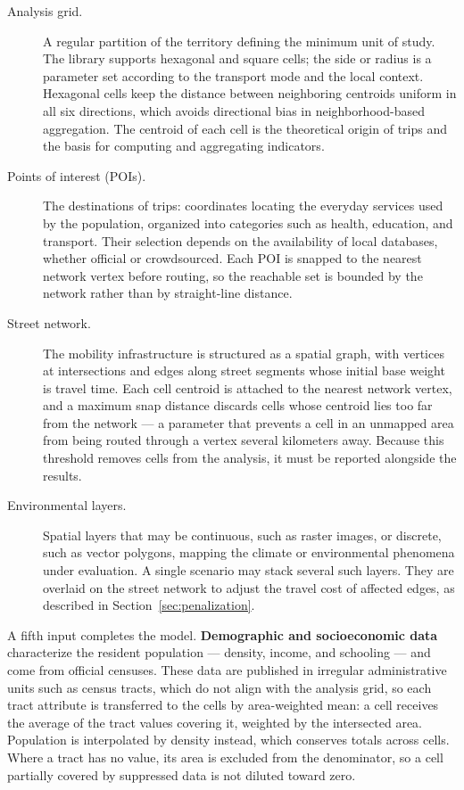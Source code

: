 \begin{description}
  \item[Analysis grid.] A regular partition of the territory defining the minimum unit of study. The library supports hexagonal and square cells; the side or radius is a parameter set according to the transport mode and the local context. Hexagonal cells keep the distance between neighboring centroids uniform in all six directions, which avoids directional bias in neighborhood-based aggregation. The centroid of each cell is the theoretical origin of trips and the basis for computing and aggregating indicators.
  \item[Points of interest (POIs).] The destinations of trips: coordinates locating the everyday services used by the population, organized into categories such as health, education, and transport. Their selection depends on the availability of local databases, whether official or crowdsourced. Each POI is snapped to the nearest network vertex before routing, so the reachable set is bounded by the network rather than by straight-line distance.
  \item[Street network.] The mobility infrastructure is structured as a spatial graph, with vertices at intersections and edges along street segments whose initial base weight is travel time. Each cell centroid is attached to the nearest network vertex, and a maximum snap distance discards cells whose centroid lies too far from the network — a parameter that prevents a cell in an unmapped area from being routed through a vertex several kilometers away. Because this threshold removes cells from the analysis, it must be reported alongside the results.
  \item[Environmental layers.] Spatial layers that may be continuous, such as raster images, or discrete, such as vector polygons, mapping the climate or environmental phenomena under evaluation. A single scenario may stack several such layers. They are overlaid on the street network to adjust the travel cost of affected edges, as described in Section~\ref{sec:penalization}.
\end{description}

A fifth input completes the model. \textbf{Demographic and socioeconomic data} characterize the resident population — density, income, and schooling — and come from official censuses. These data are published in irregular administrative units such as census tracts, which do not align with the analysis grid, so each tract attribute is transferred to the cells by area-weighted mean: a cell receives the average of the tract values covering it, weighted by the intersected area. Population is interpolated by density instead, which conserves totals across cells. Where a tract has no value, its area is excluded from the denominator, so a cell partially covered by suppressed data is not diluted toward zero.
